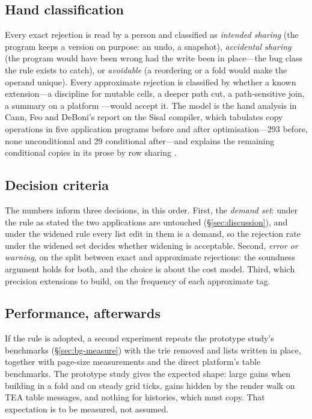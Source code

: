\subsection{Hand classification}

Every exact rejection is read by a person and classified as \emph{intended sharing} (the program keeps
a version on purpose: an undo, a snapshot), \emph{accidental sharing} (the program would have been wrong
had the write been in place---the bug class the rule exists to catch), or \emph{avoidable} (a reordering
or a fold would make the operand unique). Every approximate rejection is classified by whether a known
extension---a discipline for mutable cells, a deeper path cut, a path-sensitive join, a summary on a
platform ---would accept it. The model is the hand analysis in Cann, Feo and DeBoni's report
on the Sisal compiler, which tabulates copy operations in five application programs before and after
optimisation---293 before, none unconditional and 29 conditional after---and explains the remaining
conditional copies in its prose by row sharing \citep{cann1990sisal}.

\subsection{Decision criteria}

The numbers inform three decisions, in this order. First, the \emph{demand set}: under the rule as
stated the two applications are untouched (\S\ref{sec:discussion}), and under the widened rule every list
edit in them is a demand, so the rejection rate under the widened set decides whether widening is
acceptable. Second, \emph{error or warning}, on the split between exact and approximate rejections: the
soundness argument holds for both, and the choice is about the cost model. Third, which precision
extensions to build, on the frequency of each approximate tag.

\subsection{Performance, afterwards}

If the rule is adopted, a second experiment repeats the prototype study's benchmarks
(\S\ref{sec:bg-measure}) with the trie removed and lists written in place, together with page-size
measurements and the direct platform's table benchmarks. The prototype study gives the expected shape:
large gains when building in a fold and on steady grid ticks, gains hidden by the render walk on TEA
table messages, and nothing for histories, which must copy. That expectation is to be measured, not
assumed.
